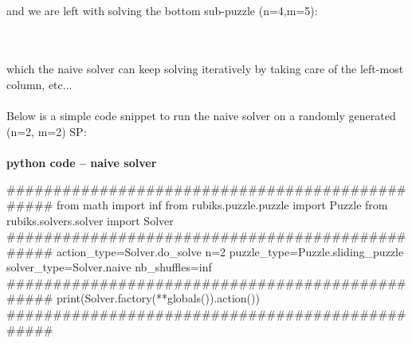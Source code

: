 \\
\begin{twentyfour}
\end{twentyfour}
%
\begin{twentyfour}
\end{twentyfour}
%
\begin{twentyfour}
\end{twentyfour}
\\
\begin{twentyfour}
\end{twentyfour}
%
\begin{twentyfour}
\end{twentyfour}
%
\begin{twentyfour}
\end{twentyfour}
\\
\\
and we are left with solving the bottom sub-puzzle (n=4,m=5):
\\
\begin{twenty}
\end{twenty}
\\
\\
which the naive solver can keep solving iteratively by taking care of the left-most column, etc...
\\
\\
Below is a simple code snippet to run the naive solver on a randomly generated (n=2, m=2) SP:
\afblue
\paragraph{}{\textbf{python code -- naive solver}}
\begin{python}
################################################
from math import inf
from rubiks.puzzle.puzzle import Puzzle
from rubiks.solvers.solver import Solver
################################################
action_type=Solver.do_solve
n=2
puzzle_type=Puzzle.sliding_puzzle
solver_type=Solver.naive
nb_shuffles=inf
################################################
print(Solver.factory(**globals()).action())
################################################
\end{python}
\black

